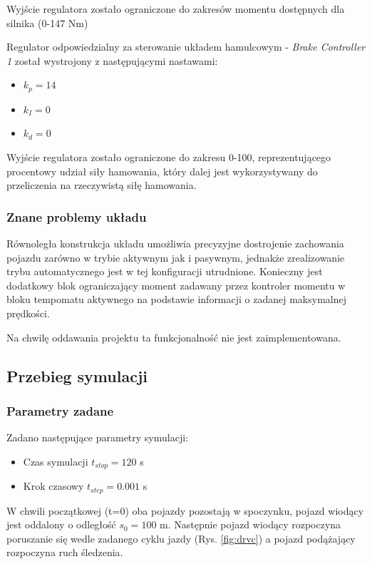 \documentclass[12pt, a4paper, headings=normal]{article}
\begin{document}
Wyjście regulatora zostało ograniczone do zakresów
momentu dostępnych dla silnika (0-147 Nm)

\bigskip

Regulator odpowiedzialny za sterowanie układem hamulcowym - \textit{Brake Controller 1}
został wystrojony z następującymi nastawami:

\begin{itemize}
	\item $k_p = 14$
	\item $k_I = 0$
	\item $k_d = 0$
\end{itemize}

Wyjście regulatora zostało ograniczone do zakresu 0-100, reprezentującego procentowy
udział siły hamowania, który dalej jest wykorzystywany do przeliczenia na rzeczywistą
siłę hamowania.

\subsubsection{Znane problemy układu}

Równoległa konstrukcja układu umożliwia precyzyjne dostrojenie zachowania pojazdu
zarówno w trybie aktywnym jak i pasywnym, jednakże zrealizowanie trybu automatycznego jest w tej konfiguracji utrudnione. Konieczny jest dodatkowy
blok ograniczający moment zadawany przez kontroler momentu w bloku tempomatu aktywnego
na podstawie informacji o zadanej maksymalnej prędkości.

Na chwilę oddawania projektu ta funkcjonalność nie jest zaimplementowana.

\subsection{Przebieg symulacji}

\subsubsection{Parametry zadane}

Zadano następujące parametry symulacji:
\begin{itemize}
	\item Czas symulacji $t_{stop} = 120$ s
	\item Krok czasowy $t_{step} = 0.001$ s
\end{itemize}

W chwili początkowej (t=0) oba pojazdy pozostają w spoczynku, pojazd wiodący jest oddalony
o odległość $s_0 = 100$ m. Następnie pojazd wiodący rozpoczyna poruszanie się wedle 
zadanego cyklu jazdy (Rys. \ref{fig:drvc}) a pojazd podążający rozpoczyna ruch
śledzenia.
\end{document}
